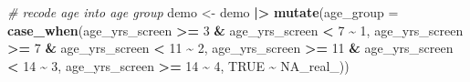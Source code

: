 \documentclass[
]{article}
\newenvironment{Shaded}{\begin{snugshade}}{\end{snugshade}}
\newcommand{\AttributeTok}[1]{\textcolor[rgb]{0.13,0.29,0.53}{#1}}
\newcommand{\CommentTok}[1]{\textcolor[rgb]{0.56,0.35,0.01}{\textit{#1}}}
\newcommand{\ConstantTok}[1]{\textcolor[rgb]{0.56,0.35,0.01}{#1}}
\newcommand{\DecValTok}[1]{\textcolor[rgb]{0.00,0.00,0.81}{#1}}
\newcommand{\FunctionTok}[1]{\textcolor[rgb]{0.13,0.29,0.53}{\textbf{#1}}}
\newcommand{\NormalTok}[1]{#1}
\newcommand{\OtherTok}[1]{\textcolor[rgb]{0.56,0.35,0.01}{#1}}
\newcommand{\SpecialCharTok}[1]{\textcolor[rgb]{0.81,0.36,0.00}{\textbf{#1}}}
\begin{document}
\begin{Shaded}
\begin{Highlighting}[]
\CommentTok{\# recode age into age group }
\NormalTok{demo }\OtherTok{\textless{}{-}}\NormalTok{ demo }\SpecialCharTok{|\textgreater{}} 
  \FunctionTok{mutate}\NormalTok{(}\AttributeTok{age\_group =} \FunctionTok{case\_when}\NormalTok{(age\_yrs\_screen }\SpecialCharTok{\textgreater{}=} \DecValTok{3} \SpecialCharTok{\&}\NormalTok{ age\_yrs\_screen }\SpecialCharTok{\textless{}} \DecValTok{7} \SpecialCharTok{\textasciitilde{}} \DecValTok{1}\NormalTok{,}
\NormalTok{                                          age\_yrs\_screen }\SpecialCharTok{\textgreater{}=} \DecValTok{7} \SpecialCharTok{\&}\NormalTok{ age\_yrs\_screen }\SpecialCharTok{\textless{}} \DecValTok{11} \SpecialCharTok{\textasciitilde{}} \DecValTok{2}\NormalTok{, }
\NormalTok{                                          age\_yrs\_screen }\SpecialCharTok{\textgreater{}=} \DecValTok{11} \SpecialCharTok{\&}\NormalTok{ age\_yrs\_screen }\SpecialCharTok{\textless{}} \DecValTok{14} \SpecialCharTok{\textasciitilde{}} \DecValTok{3}\NormalTok{, }
\NormalTok{                                          age\_yrs\_screen }\SpecialCharTok{\textgreater{}=} \DecValTok{14} \SpecialCharTok{\textasciitilde{}} \DecValTok{4}\NormalTok{,}
                                          \ConstantTok{TRUE} \SpecialCharTok{\textasciitilde{}} \ConstantTok{NA\_real\_}\NormalTok{))}


\end{Highlighting}
\end{Shaded}
\end{document}

